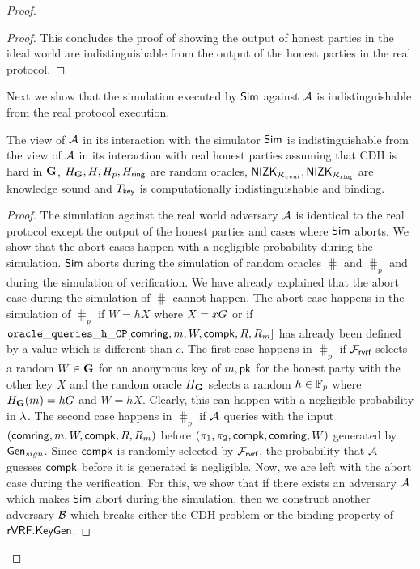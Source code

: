 \begin{proof}
\begin{proof}
			This concludes the proof of showing the output of honest parties in the ideal world are indistinguishable from the output of the honest parties in the real protocol.
		\end{proof}	
		
		Next we show that the simulation executed by $ \mathsf{Sim} $ against $ \mathcal{A} $ is indistinguishable from the real protocol execution.
		
		\begin{lemma} \label{lem:simulation-ind}
			The view of $ \mathcal{A} $ in its interaction with the simulator $ \mathsf{Sim} $ is indistinguishable from the view of $ \mathcal{A} $ in its interaction with real honest parties assuming that CDH is hard in $ {\mathbf{G}} $, $H_{\mathbf{G}}, H, H_p, H_\mathsf{ring} $ are random oracles, $ {\mathsf{NIZK}}_{\mathcal{R}_{eval}}, {\mathsf{NIZK}}_{\mathcal{R}_{\mathtt{ring}}} $ are knowledge sound and $ T_{\mathsf{key}} $ is computationally indistinguishable and binding.
		\end{lemma}
		
		
		\begin{proof}
			The  simulation against the real world adversary $ \mathcal{A} $ is identical to the real protocol except the output of the honest parties and cases where $ \mathsf{Sim} $ aborts. 
			We show that the abort cases happen with a negligible probability during the simulation. $ \mathsf{Sim} $ aborts during the simulation of random oracles $ \hash $ and $ \hash_p $ and during the simulation of verification. We have already explained that the abort case during the simulation of $ \hash $ cannot happen. The abort case happens in the simulation of $ \hash_p $ if $ W = hX $ where $ X = xG $ or if $ \mathtt{oracle\_queries\_h\_CP}[\mathsf{comring},m,W,\mathsf{compk},R,R_m] $ has already been defined by a value which is different than $ c $. The first case happens in $ \hash_p $ if $ \mathcal{F}_{\textsf{rvrf}} $ selects a random $ W \in {\mathbf{G}}$ for an anonymous key of $ m, \mathsf{pk}  $ for the honest party with the other key $ X  $ and the random oracle $ H_{\mathbf{G}} $ selects a random $ h \in \mathbb{F}_p  $ where $ H_{\mathbf{G}}(m) = hG $ and $ W = hX $. Clearly, this can happen with a negligible probability in $ \lambda $. The 
			second case happens in $ \hash_p $ if $ \mathcal{A} $ queries with the input $ (\mathsf{comring},m,W,\mathsf{compk},R,R_m) $ before $ (\pi_1,\pi_2,\mathsf{compk},\mathsf{comring},W) $ generated by $ \mathsf{Gen}_{sign} $. Since $ \mathsf{compk} $ is randomly selected by $ \mathcal{F}_{\textsf{rvrf}} $, the probability that $ \mathcal{A} $ guesses $ \mathsf{compk} $ before it is generated is negligible.
			Now, we are left with the abort case during the verification.
			For this, we show that if there exists an adversary $ \mathcal{A} $ which makes $ \mathsf{Sim} $ abort during the simulation, then we construct another adversary $ \mathcal{B} $ which breaks either the CDH problem or the binding property of $ {\mathsf{rVRF}}.{\mathsf{KeyGen}} $.
			

\end{proof}
\end{proof}
